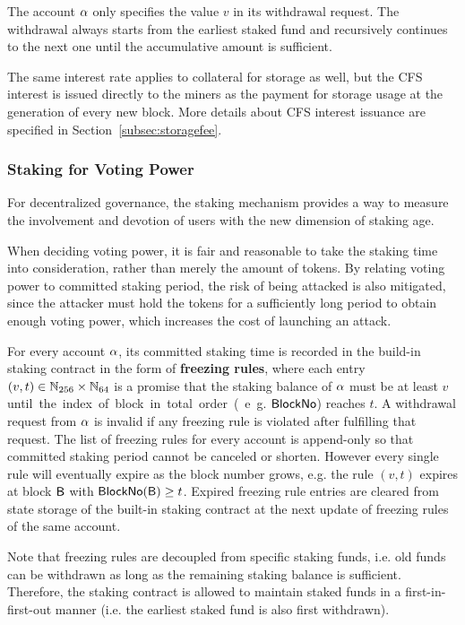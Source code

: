 The account $\mathbf{\alpha}$ only specifies the value $v$ in its withdrawal request. 
The withdrawal always starts from the earliest staked fund and recursively continues to the next one until the accumulative amount is sufficient.

The same interest rate applies to collateral for storage as well, but the CFS interest is issued directly to the miners as the payment for storage usage at the generation of every new block.
More details about CFS interest issuance are specified in Section~\ref{subsec:storagefee}.


\subsubsection{Staking for Voting Power}

For decentralized governance, the staking mechanism provides a way to measure the involvement and devotion of users with the new dimension of staking age.

When deciding voting power, it is fair and reasonable to take the staking time into consideration,
rather than merely the amount of tokens.
By relating voting power to committed staking period, the risk of being attacked is also mitigated,
since the attacker must hold the tokens for a sufficiently long period to obtain enough voting power, which increases the cost of launching an attack.

For every account $\mathbf{\alpha}$, its committed staking time is recorded in the build-in staking contract in the form of 
{\bf freezing rules},
where each entry $(v,t)\in \mathbb{N}_{256}\times\mathbb{N}_{64}$ is a promise that the  staking balance of $\mathbf{\alpha}$ must be at least $v$ \unit until the index of block in total order (e.g. $\mathsf{BlockNo}$) reaches $t$.
A withdrawal request from $\mathbf{\alpha}$ is invalid if any freezing rule is violated after fulfilling that request.
The list of freezing rules for every account is append-only so that committed staking period cannot be canceled or shorten.
However every single rule will eventually expire as the block number grows, e.g. the rule $(v,t)$ expires at block $\textsf{B}$ with $\mathsf{BlockNo}(\textsf{B})\ge t$. 
Expired freezing rule entries are cleared from state storage of the built-in staking contract at the next update of freezing rules of the same account.	

Note that freezing rules are decoupled from specific staking funds, i.e. old funds can be withdrawn as long as the remaining staking balance is sufficient. 
Therefore, the staking contract is allowed to maintain staked funds in a first-in-first-out manner (i.e. the earliest staked fund is also first withdrawn).



